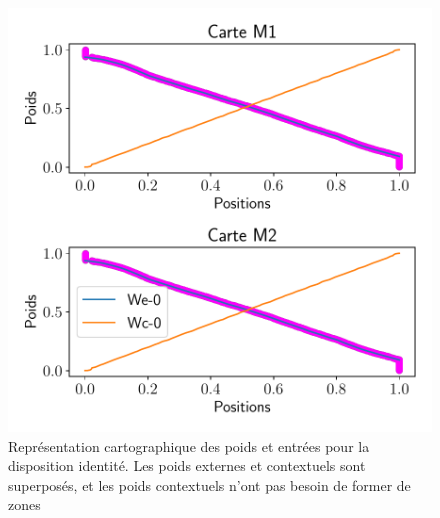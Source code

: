 \documentclass[../main]{subfiles}
\begin{document}
\begin{figure}
	\centering\includegraphics[width=\textwidth]{2som_id_w.pdf}
	\caption{Représentation cartographique des poids et entrées pour la disposition identité. Les poids externes et contextuels sont superposés, et les poids contextuels n'ont pas besoin de former de zones \label{fig:id_results}}
	\end{figure}
	
\end{document}
